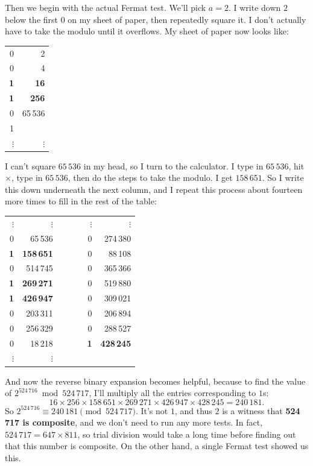 \documentclass[11pt,paper=letter]{scrartcl}
\begin{document}
Then we begin with the actual Fermat test. We'll pick $a = 2$. I write down $2$ below the first $0$ on my sheet of paper, then repeatedly square it. I don't actually have to take the modulo until it overflows. My sheet of paper now looks like:
\begin{center}
  \begin{tabular}{rr}
    0 & 2 \\
    0 & 4 \\
    \textbf{1} & \textbf{16} \\
    \textbf{1} & \textbf{256} \\
    0 & 65\,536 \\
    1 & \\
    $\vdots$ & $\vdots$
  \end{tabular}
\end{center}
I can't square $65\,536$ in my head, so I turn to the calculator. I type in $65\,536$, hit $\times$, type in $65\,536$, then do the steps to take the modulo. I get $158\,651$. So I write this down underneath the next column, and I repeat this process about fourteen more times to fill in the rest of the table:
\begin{center}
  \begin{tabular}{rrcrr}
    $\vdots$ & $\vdots$ & $\phantom{a\quad a}$ & $\vdots$ & $\vdots$ \\
    0 &  65\,536 & & 0 & 274\,380 \\
    \textbf{1} & \textbf{158\,651} & & 0 &  88\,108 \\
    0 & 514\,745 & & 0 & 365\,366 \\
    \textbf{1} & \textbf{269\,271} & & 0 & 519\,880 \\
    \textbf{1} & \textbf{426\,947} & & 0 & 309\,021 \\
    0 & 203\,311 & & 0 & 206\,894 \\
    0 & 256\,329 & & 0 & 288\,527 \\
    0 &  18\,218 & & \textbf{1} & \textbf{428\,245} \\
    $\vdots$ & $\vdots$ & & &
  \end{tabular}
\end{center}
And now the reverse binary expansion becomes helpful, because to find the value of $2^{524\,716} \bmod 524\,717$, I'll multiply all the entries corresponding to $1$s:
$$16 \times 256 \times 158\,651 \times 269\,271 \times 426\,947 \times 428\,245 = 240\,181.$$
So $2^{524\,716} \equiv 240\,181 \pmod{524\,717}$. It's not $1$, and thus $2$ is a witness that \textbf{524\,717 is composite}, and we don't need to run any more tests. In fact, $524\,717 = 647 \times 811$, so trial division would take a long time before finding out that this number is composite. On the other hand, a single Fermat test showed us this.
\end{document}
